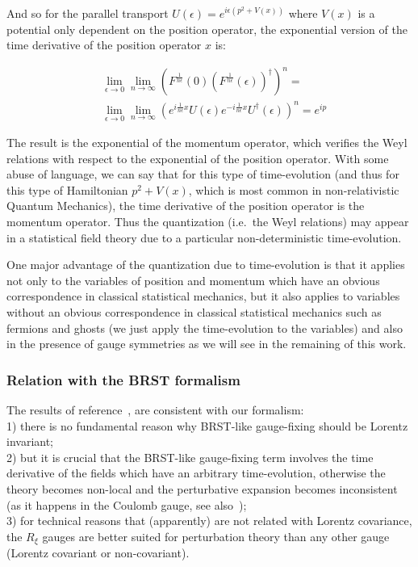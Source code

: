 \documentclass[11pt]{book}
\begin{document}
And so for the parallel transport
\(U(\epsilon)=e^{i\epsilon (p^2+V(x))}\) where \(V(x)\) is a potential
only dependent on the position operator, the exponential version of the
time derivative of the position operator \(x\) is:

\begin{equation}\begin{aligned}
    &\lim_{\epsilon \to 0}\lim_{n \to \infty}(F^{\frac{1}{n\epsilon}}(0)(F^{\frac{1}{n\epsilon}}(\epsilon))^{\dagger})^n=\\
    &\lim_{\epsilon \to 0}\lim_{n \to \infty} (e^{i\frac{1}{n\epsilon} x} U(\epsilon)
    e^{-i\frac{1}{n \epsilon} x} U^\dagger (\epsilon))^n=
    e^{i p} \end{aligned}\end{equation}

The result is the exponential of the momentum operator, which verifies
the Weyl relations with respect to the exponential of the position
operator. With some abuse of language, we can say that for this type of
time-evolution (and thus for this type of Hamiltonian \(p^2+V(x)\),
which is most common in non-relativistic Quantum Mechanics), the time
derivative of the position operator is the momentum operator. Thus the
quantization (i.e.~the Weyl relations) may appear in a statistical field
theory due to a particular non-deterministic time-evolution.

One major advantage of the quantization due to time-evolution is that it
applies not only to the variables of position and momentum which have an
obvious correspondence in classical statistical mechanics, but it also
applies to variables without an obvious correspondence in classical
statistical mechanics such as fermions and ghosts (we just apply the
time-evolution to the variables) and also in the presence of gauge
symmetries as we will see in the remaining of this work.

\hypertarget{relation-with-the-brst-formalism}{%
\subsubsection{Relation with the BRST
formalism}\label{relation-with-the-brst-formalism}}

The results of
reference~\cite{Burnel2008Noncovariant}, are consistent with our formalism:\\
1) there is no fundamental reason why BRST-like gauge-fixing should be
Lorentz invariant;\\
2) but it is crucial that the BRST-like gauge-fixing term involves the
time derivative of the fields which have an arbitrary time-evolution,
otherwise the theory becomes non-local and the perturbative expansion
becomes inconsistent (as it happens in the Coulomb gauge, see
also~\cite{Rothe2010Classical}\cite{Keller2005On});\\
3) for technical reasons that (apparently) are not related with Lorentz
covariance, the \(R_\xi\) gauges are better suited for perturbation
theory than any other gauge (Lorentz covariant or non-covariant).
\end{document}
